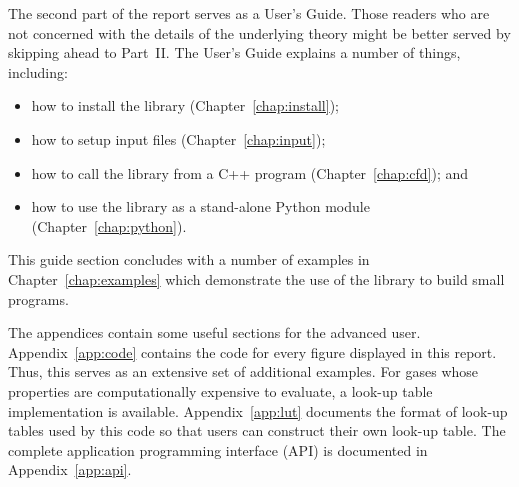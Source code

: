 The second part of the report serves as a User's Guide.
Those readers who are not concerned with the details of the underlying theory
might be better served by skipping ahead to Part~II.
The User's Guide explains a number of things, including:
\begin{itemize}
\item how to install the library (Chapter~\ref{chap:install});
\item how to setup input files (Chapter~\ref{chap:input});
\item how to call the library from a C++ program (Chapter~\ref{chap:cfd}); and
\item how to use the library as a stand-alone Python module (Chapter~\ref{chap:python}).
\end{itemize}
This guide section concludes with a number of examples in Chapter~\ref{chap:examples}
which demonstrate the use of the library to build small programs.

The appendices contain some useful sections for the advanced user.
Appendix~\ref{app:code} contains the code for every figure displayed
in this report.
Thus, this serves as an extensive set of additional examples.
For gases whose properties are computationally expensive to evaluate,
a look-up table implementation is available.
Appendix~\ref{app:lut} documents the format of look-up tables used
by this code so that users can construct their own look-up table.
The complete application programming interface (API) is documented in
Appendix~\ref{app:api}.













